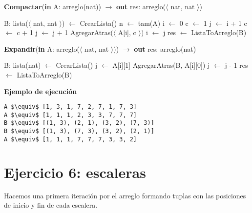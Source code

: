\begin{algorithm}[H]
\caption{
    \textbf{Compactar}(\textbf{in} A: arreglo(nat)) $\to$ \textbf{out} res: arreglo($\langle$ nat, nat $\rangle$)
}
\begin{algorithmic}[1]
    \State B: lista($\langle$ nat, nat $\rangle$) $\gets$ CrearLista() 
    \State n $\gets$ tam(A)
    \State i $\gets$ 0
     
        \State c $\gets$ 1
        \State j $\gets$ i + 1
            \State c $\gets$ c + 1
            \State j $\gets$ j + 1
        \EndWhile
        \State AgregarAtras($\langle$ A[i], c $\rangle$) 
        \State i $\gets$ j
    \EndWhile
    \State res $\gets$ ListaToArreglo(B) 
\end{algorithmic}
\end{algorithm}

\begin{algorithm}[H]
\caption{
    \textbf{Expandir}(\textbf{in} A: arreglo($\langle$ nat, nat $\rangle$)) $\to$ \textbf{out} res: arreglo(nat)
}
\begin{algorithmic}[1]
    \State B: lista(nat) $\gets$ CrearLista() 
     
        \State j $\gets$ A[i][1]
         
            \State AgregarAtras(B, A[i][0]) 
            \State j $\gets$ j - 1
        \EndWhile
    \EndFor
    \State res $\gets$ ListaToArreglo(B) 
\end{algorithmic}
\end{algorithm}

\textbf{Ejemplo de ejecución}

\begin{lstlisting}
A $\equiv$ [1, 3, 1, 7, 2, 7, 1, 7, 3]
A $\equiv$ [1, 1, 1, 2, 3, 3, 7, 7, 7]
B $\equiv$ [(1, 3), (2, 1), (3, 2), (7, 3)]
B $\equiv$ [(1, 3), (7, 3), (3, 2), (2, 1)]
A $\equiv$ [1, 1, 1, 7, 7, 7, 3, 3, 2]
\end{lstlisting}

\section{Ejercicio 6: escaleras}

Hacemos una primera iteración por el arreglo formando tuplas con las posiciones de inicio y fin de cada escalera.


